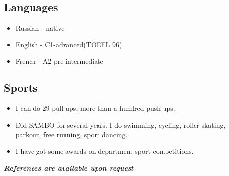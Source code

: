 \documentclass[letterpaper]{resume}
\begin{document}
\subsection{Languages}
\begin{itemize}
	\item Russian - native
	\item English - C1-advanced(TOEFL 96)
	\item French - A2-pre-intermediate
\end{itemize}

\subsection{Sports}
\begin{itemize}
	\item I can do 29 pull-ups, more than a hundred push-ups.
        \item Did SAMBO for several years. I do swimming, cycling, roller skating, parkour, free running, sport dancing.
	\item I have got some awards on department sport competitions.
\end{itemize}


\emph{\bf References are available upon request}
\end{document}
